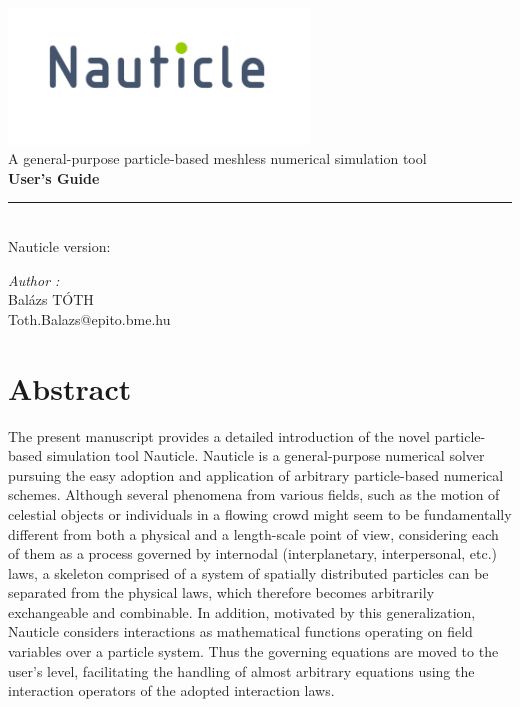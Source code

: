 \documentclass[a4paper,12pt,openany]{book}
\theoremstyle{break}
\begin{document}
\frontmatter
\begin{titlepage}
\begin{center}
\vspace{5cm}
\includegraphics[width=0.6\textwidth]{nauticle_logo.pdf}\\[0.5cm]
{\large A general-purpose particle-based meshless numerical simulation tool}\\ [5cm]
{ \huge \bfseries User's Guide \\[0.2cm] }
\color{nauticlegreen}
\rule{\linewidth}{1.5mm} \\[0.5cm]
\color{black}
{\large Nauticle version: \nauticleversion{} \\}
\vfill
\noindent
\begin{minipage}{1\textwidth}
  \begin{flushright} \large
    \emph{Author :}\\
    Balázs TÓTH \\
    Toth.Balazs@epito.bme.hu
  \end{flushright}
\end{minipage}
\end{center}
\end{titlepage}
\clearpage\mbox{}\clearpage
\chapter{Abstract}
The present manuscript provides a detailed introduction of the novel particle-based simulation tool Nauticle. Nauticle is a general-purpose numerical solver pursuing the easy adoption and application of arbitrary particle-based numerical schemes. Although several phenomena from various fields, such as the motion of celestial objects or individuals in a flowing crowd might seem to be fundamentally different from both a physical and a length-scale point of view, considering each of them as a process governed by internodal (interplanetary, interpersonal, etc.) laws, a skeleton comprised of a system of spatially distributed particles can be separated from the physical laws, which therefore becomes arbitrarily exchangeable and combinable. In addition, motivated by this generalization, Nauticle considers interactions as mathematical functions operating on field variables over a particle system. Thus the governing equations are moved to the user's level, facilitating the handling of almost arbitrary equations using the interaction operators of the adopted interaction laws.
\end{document}

